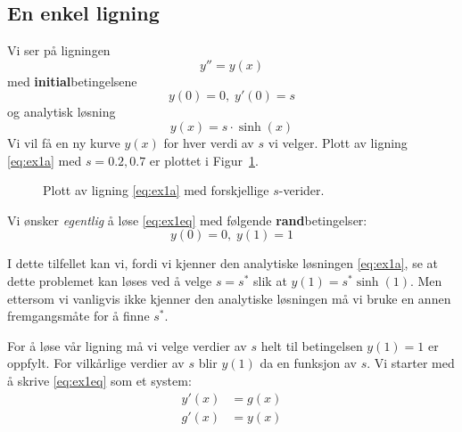 
\clearpage

\subsection{En enkel ligning} %
\label{sub:en_enkel_ligning}

Vi ser på ligningen
\begin{equation}
  y'' = y(x) \label{eq:ex1eq}
\end{equation}
med \textbf{initial}betingelsene
\begin{equation}
  y(0) = 0, \; y'(0) = s \tag{ib} \label{eq:ex1b}
\end{equation}
og analytisk løsning
\begin{equation}
  y(x) = s\cdot \sinh(x) \tag{a} \label{eq:ex1a}
\end{equation}
Vi vil få en ny kurve $y(x)$ for hver verdi av $s$ vi velger. Plott av ligning \eqref{eq:ex1a} med $s=0.2, 0.7$ er plottet i Figur~\ref{fig:s_verdier}.

\begin{figure}[htb]
  \centering
  \caption{Plott av ligning \eqref{eq:ex1a} med forskjellige $s$-verider.}
  \label{fig:s_verdier}
\end{figure}

\noindent Vi ønsker \emph{egentlig} å løse \eqref{eq:ex1eq} med følgende \textbf{rand}betingelser:
\begin{equation}
  y(0) = 0, \; y(1) = 1 \tag{rb}
\end{equation}

I dette tilfellet kan vi, fordi vi kjenner den analytiske løsningen \eqref{eq:ex1a}, se at dette problemet kan løses ved å velge $s=s^*$ slik at $y(1)=s^* \sinh(1)$. Men ettersom vi vanligvis ikke kjenner den analytiske løsningen må vi bruke en annen fremgangsmåte for å finne $s^*$.

For å løse vår ligning må vi velge verdier av $s$ helt til betingelsen $y(1)=1$ er oppfylt. For vilkårlige verdier av $s$ blir $y(1)$ da en funksjon av $s$. Vi starter med å skrive \eqref{eq:ex1eq} som et system:
\begin{align}
  y'(x) &= g(x) \\
  g'(x) &= y(x)
\end{align}

